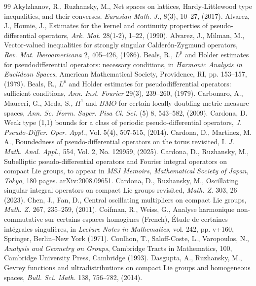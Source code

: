 \documentclass[12pt, reqno]{amsart}
\theoremstyle{definition}
\theoremstyle{remark}
\numberwithin{equation}{section}
\begin{document}

\begin{thebibliography}{99}
 Akylzhanov, R., Ruzhansky, M., Net spaces on lattices, Hardy-Littlewood type inequalities, and their converses. \textit{Eurasian Math. J.}, 8(3), 10–27, (2017).
     Alvarez, J., Hounie, J., Estimates for the kernel and continuity properties of pseudo-differential operators, \textit{Ark. Mat.} 28(1-2), 1--22, (1990).
     Alvarez, J., Milman, M., Vector-valued inequalities for strongly singular Calderón-Zygmund operators, \textit{Rev. Mat. Iberoamericana} 2, 405--426, (1986).
     Beals, R., $L^p$ and Holder estimates for pseudodifferential operators: necessary conditions, in \textit{Harmonic Analysis in Euclidean Spaces}, American Mathematical Society, Providence, RI, pp. 153--157, (1979).
     Beals, R., $L^p$ and Holder estimates for pseudodifferential operators: sufficient conditions, \textit{Ann. Inst. Fourier} 29(3), 239--260, (1979).
     Carbonaro, A., Mauceri, G., Meda, S., $H^1$ and $BMO$ for certain locally doubling metric measure spaces, \textit{Ann. Sc. Norm. Super. Pisa Cl. Sci.} (5) 8, 543--582, (2009).
     Cardona, D. Weak type (1,1) bounds for a class of periodic pseudo-differential operators,
    \textit{J. Pseudo-Differ. Oper. Appl.}, Vol. 5(4), 507-515, (2014).
     Cardona, D., Martinez, M. A., Boundedness of pseudo-differential operators on the torus revisited, I. \textit{J. Math. Anal. Appl.,} 554, Vol. 2, No. 129959, (2025).  
     Cardona, D., Ruzhansky, M., Subelliptic pseudo-differential operators and Fourier integral operators on compact Lie groups, to appear in \textit{MSJ Memoirs, Mathematical Society of Japan, Tokyo}, 180 pages. arXiv:2008.09651.
     Cardona, D., Ruzhansky, M., Oscillating singular integral operators on compact Lie groups revisited, \textit{Math. Z.} 303, 26 (2023).
     Chen, J., Fan, D., Central oscillating multipliers on compact Lie groups, \textit{Math. Z.} 267, 235--259, (2011).
     Coifman, R., Weiss, G., Analyse harmonique non-commutative sur certains espaces homogènes (French), Étude de certaines intégrales singulières, in \textit{Lecture Notes in Mathematics}, vol. 242, pp. v+160, Springer, Berlin--New York (1971).
     Coulhon, T., Saloff-Coste, L., Varopoulos, N., \textit{Analysis and Geometry on Groups}, Cambridge Tracts in Mathematics, 100, Cambridge University Press, Cambridge (1993).
     Dasgupta, A., Ruzhansky, M., Gevrey functions and ultradistributions on compact Lie groups and homogeneous spaces, \textit{Bull. Sci. Math.} 138, 756--782, (2014).

\end{thebibliography}
\end{document}
